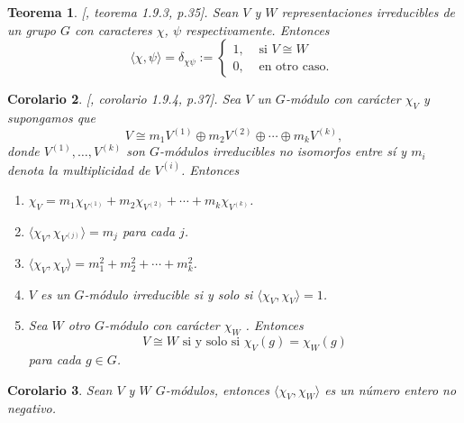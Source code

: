 \documentclass[12pt]{book}
\newtheorem{theorem}{Teorema}[section]
\newtheorem{corollary}[theorem]{Corolario}
\theoremstyle{definition}
\newcounter{in}
\begin{document}
\begin{theorem}{[\cite{sagan2001symmetric}, teorema 1.9.3, p.35]}.
  \label{prod-car-irr}
  Sean $V$ y $W$ representaciones irreducibles de un grupo $G$ con
  caracteres $\chi$, $\psi$ respectivamente. Entonces
  \[
  \langle\chi,\psi\rangle=\delta_{\chi\psi}:=
  \begin{cases}
    1, & \text{ si }  V\cong W \\
    0, & \text{ en otro caso. } 
  \end{cases}
  \]
\end{theorem}
\begin{corollary}{[\cite{sagan2001symmetric}, corolario 1.9.4, p.37]}.
  \label{multiplicidad}
  Sea $V$ un $G$-módulo con carácter $\chi_{V}$ y supongamos que 
  \begin{equation*}
    V\cong m_{1}V^{(1)}\oplus m_{2}V^{(2)}\oplus\cdots\oplus
    m_{k}V^{(k)},
  \end{equation*}
donde $V^{(1)},\ldots,V^{(k)}$ son $G$-módulos
irreducibles no isomorfos entre sí y $m_{i}$ denota la multiplicidad
de $V^{(i)}$. Entonces
\begin{enumerate}
\item $\chi_{V}=m_{1}\chi_{V^{(1)}}+m_{2}\chi_{V^{(2)}}+\cdots+m_{k}\chi_{V^{(k)}}$.
\item $\langle\chi_{V},\chi_{V^{(j)}}\rangle=m_{j}$ para cada $j$.
\item $\langle\chi_{V},\chi_{V}\rangle=m_{1}^{2}+m_{2}^{2}+\cdots+m_{k}^{2}$.
\item $V$ es un $G$-módulo irreducible si y solo si $\langle\chi_{V},\chi_{V}\rangle=1$.
\item Sea $W$ otro $G$-módulo con carácter $\chi_{W}$ . Entonces 
  $$V\cong W \mbox{ si y solo si } \chi_{V}(g)=\chi_{W}(g)$$
  para cada $g\in G$.
\end{enumerate}
\end{corollary}
\begin{corollary}
  \label{prod-car-pos}
  Sean $V$ y $W$ $G$-módulos, entonces $\langle\chi_{V},\chi_{W}\rangle$ es un número entero no negativo.
\end{corollary}
\end{document}
